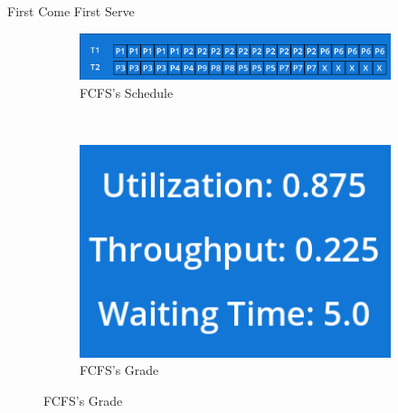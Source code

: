 \documentclass{beamer}
\begin{document}
\begin{frame}{First Come First Serve}
	\centering
	\begin{figure}[h!]
		\begin{subfigure}{0.9\textwidth}
			\includegraphics[width=1\textwidth]{FCFSSchedule.png}
			\caption*{\large FCFS's Schedule}
		\end{subfigure} \\
		\begin{subfigure}{0.4\textwidth}
			\includegraphics[width=1\textwidth]{FCFSGrade.png}
			\caption*{\large FCFS's Grade}
		\end{subfigure}
	\end{figure}
\end{frame}
\end{document}
